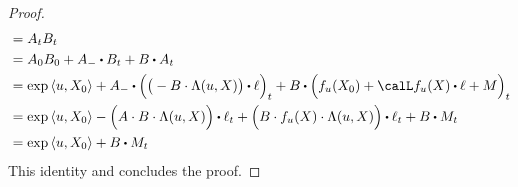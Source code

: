 \begin{proof}
\begin{align*}
    &= A_t B_t \\
    &= A_0 B_0 + A_- \shortInt B_t + B \shortInt A_t \\
    &= \exp\prj{\momentVar}{\X_0} + A_- \shortInt \Big(\big( -B \cdot \ode(\momentVar, \X) \big)\shortInt \leb \Big)_t  + B \shortInt \Big( f_\momentVar(\X_0) + \generator f_\momentVar(\X) \shortInt \leb + M \Big)_t \\
    &= \exp\prj{\momentVar}{\X_0} - \Big( A \cdot B \cdot \ode(\momentVar, \X) \Big) \shortInt \leb_t + \Big( B \cdot f_\momentVar(\X) \cdot \ode(\momentVar, \X) \Big) \shortInt \leb_t + B \shortInt M_t \\
    &= \exp\prj{\momentVar}{\X_0} + B\shortInt M_t
  \end{align*}
  This identity and \cite[Remark I.4.34(b)]{jacod2003} concludes the proof.
\end{proof}
